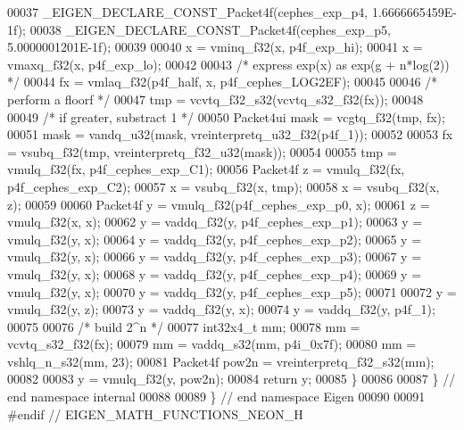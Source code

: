 \begin{DoxyCode}
00037   \_EIGEN\_DECLARE\_CONST\_Packet4f(cephes\_exp\_p4, 1.6666665459E-1f);
00038   \_EIGEN\_DECLARE\_CONST\_Packet4f(cephes\_exp\_p5, 5.0000001201E-1f);
00039 
00040   x = vminq\_f32(x, p4f\_exp\_hi);
00041   x = vmaxq\_f32(x, p4f\_exp\_lo);
00042 
00043   \textcolor{comment}{/* express exp(x) as exp(g + n*log(2)) */}
00044   fx = vmlaq\_f32(p4f\_half, x, p4f\_cephes\_LOG2EF);
00045 
00046   \textcolor{comment}{/* perform a floorf */}
00047   tmp = vcvtq\_f32\_s32(vcvtq\_s32\_f32(fx));
00048 
00049   \textcolor{comment}{/* if greater, substract 1 */}
00050   Packet4ui mask = vcgtq\_f32(tmp, fx);
00051   mask = vandq\_u32(mask, vreinterpretq\_u32\_f32(p4f\_1));
00052 
00053   fx = vsubq\_f32(tmp, vreinterpretq\_f32\_u32(mask));
00054 
00055   tmp = vmulq\_f32(fx, p4f\_cephes\_exp\_C1);
00056   Packet4f z = vmulq\_f32(fx, p4f\_cephes\_exp\_C2);
00057   x = vsubq\_f32(x, tmp);
00058   x = vsubq\_f32(x, z);
00059 
00060   Packet4f y = vmulq\_f32(p4f\_cephes\_exp\_p0, x);
00061   z = vmulq\_f32(x, x);
00062   y = vaddq\_f32(y, p4f\_cephes\_exp\_p1);
00063   y = vmulq\_f32(y, x);
00064   y = vaddq\_f32(y, p4f\_cephes\_exp\_p2);
00065   y = vmulq\_f32(y, x);
00066   y = vaddq\_f32(y, p4f\_cephes\_exp\_p3);
00067   y = vmulq\_f32(y, x);
00068   y = vaddq\_f32(y, p4f\_cephes\_exp\_p4);
00069   y = vmulq\_f32(y, x);
00070   y = vaddq\_f32(y, p4f\_cephes\_exp\_p5);
00071 
00072   y = vmulq\_f32(y, z);
00073   y = vaddq\_f32(y, x);
00074   y = vaddq\_f32(y, p4f\_1);
00075 
00076   \textcolor{comment}{/* build 2^n */}
00077   int32x4\_t mm;
00078   mm = vcvtq\_s32\_f32(fx);
00079   mm = vaddq\_s32(mm, p4i\_0x7f);
00080   mm = vshlq\_n\_s32(mm, 23);
00081   Packet4f pow2n = vreinterpretq\_f32\_s32(mm);
00082 
00083   y = vmulq\_f32(y, pow2n);
00084   \textcolor{keywordflow}{return} y;
00085 \}
00086 
00087 \} \textcolor{comment}{// end namespace internal}
00088 
00089 \} \textcolor{comment}{// end namespace Eigen}
00090 
00091 \textcolor{preprocessor}{#endif // EIGEN\_MATH\_FUNCTIONS\_NEON\_H}
\end{DoxyCode}

